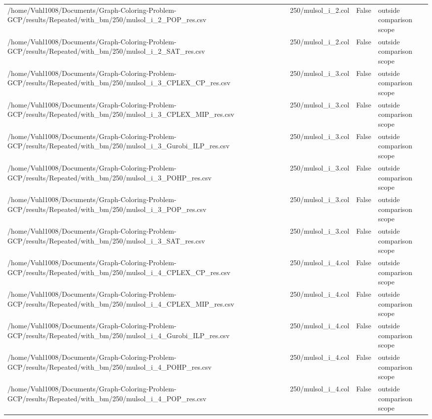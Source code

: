 \begin{table}[htbp]
\begin{tabular}{llll}
/home/Vuhl1008/Documents/Graph-Coloring-Problem-GCP/results/Repeated/with\_bm/250/mulsol\_i\_2\_POP\_res.csv & 250/mulsol\_i\_2.col & False & outside comparison scope \\
/home/Vuhl1008/Documents/Graph-Coloring-Problem-GCP/results/Repeated/with\_bm/250/mulsol\_i\_2\_SAT\_res.csv & 250/mulsol\_i\_2.col & False & outside comparison scope \\
/home/Vuhl1008/Documents/Graph-Coloring-Problem-GCP/results/Repeated/with\_bm/250/mulsol\_i\_3\_CPLEX\_CP\_res.csv & 250/mulsol\_i\_3.col & False & outside comparison scope \\
/home/Vuhl1008/Documents/Graph-Coloring-Problem-GCP/results/Repeated/with\_bm/250/mulsol\_i\_3\_CPLEX\_MIP\_res.csv & 250/mulsol\_i\_3.col & False & outside comparison scope \\
/home/Vuhl1008/Documents/Graph-Coloring-Problem-GCP/results/Repeated/with\_bm/250/mulsol\_i\_3\_Gurobi\_ILP\_res.csv & 250/mulsol\_i\_3.col & False & outside comparison scope \\
/home/Vuhl1008/Documents/Graph-Coloring-Problem-GCP/results/Repeated/with\_bm/250/mulsol\_i\_3\_POHP\_res.csv & 250/mulsol\_i\_3.col & False & outside comparison scope \\
/home/Vuhl1008/Documents/Graph-Coloring-Problem-GCP/results/Repeated/with\_bm/250/mulsol\_i\_3\_POP\_res.csv & 250/mulsol\_i\_3.col & False & outside comparison scope \\
/home/Vuhl1008/Documents/Graph-Coloring-Problem-GCP/results/Repeated/with\_bm/250/mulsol\_i\_3\_SAT\_res.csv & 250/mulsol\_i\_3.col & False & outside comparison scope \\
/home/Vuhl1008/Documents/Graph-Coloring-Problem-GCP/results/Repeated/with\_bm/250/mulsol\_i\_4\_CPLEX\_CP\_res.csv & 250/mulsol\_i\_4.col & False & outside comparison scope \\
/home/Vuhl1008/Documents/Graph-Coloring-Problem-GCP/results/Repeated/with\_bm/250/mulsol\_i\_4\_CPLEX\_MIP\_res.csv & 250/mulsol\_i\_4.col & False & outside comparison scope \\
/home/Vuhl1008/Documents/Graph-Coloring-Problem-GCP/results/Repeated/with\_bm/250/mulsol\_i\_4\_Gurobi\_ILP\_res.csv & 250/mulsol\_i\_4.col & False & outside comparison scope \\
/home/Vuhl1008/Documents/Graph-Coloring-Problem-GCP/results/Repeated/with\_bm/250/mulsol\_i\_4\_POHP\_res.csv & 250/mulsol\_i\_4.col & False & outside comparison scope \\
/home/Vuhl1008/Documents/Graph-Coloring-Problem-GCP/results/Repeated/with\_bm/250/mulsol\_i\_4\_POP\_res.csv & 250/mulsol\_i\_4.col & False & outside comparison scope \\

\end{tabular}
\end{table}
